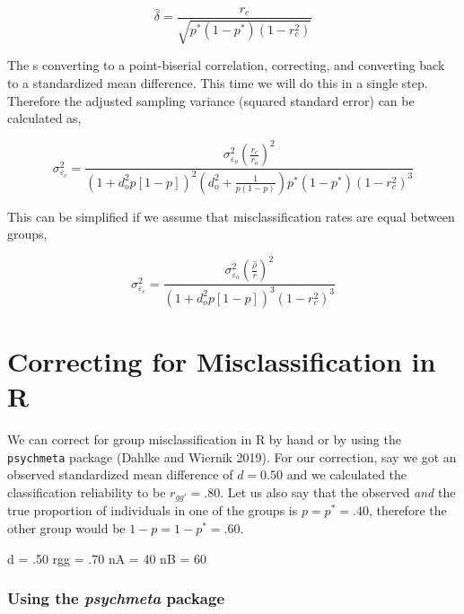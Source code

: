 \documentclass[
  letterpaper,
  DIV=11,
  numbers=noendperiod]{scrreprt}
\newenvironment{Shaded}{\begin{snugshade}}{\end{snugshade}}
\newcommand{\DecValTok}[1]{\textcolor[rgb]{0.68,0.00,0.00}{#1}}
\newcommand{\NormalTok}[1]{\textcolor[rgb]{0.00,0.23,0.31}{#1}}
\newcommand{\OtherTok}[1]{\textcolor[rgb]{0.00,0.23,0.31}{#1}}
\begin{document}
\[
\hat{\delta} = \frac{r_c}{\sqrt{p^*\left(1-p^*\right)\left(1-r_c^2\right)}}
\]

The s converting to a point-biserial correlation, correcting, and
converting back to a standardized mean difference. This time we will do
this in a single step. Therefore the adjusted sampling variance (squared
standard error) can be calculated as,

\[
\sigma^2_{\varepsilon_c} = \frac {\sigma^2_{\varepsilon_o}\left(\frac{r_c}{r_o}\right)^2} {\left(1+d_o^2p[1-p]\right)^2\left(d_o^2+\frac{1}{p(1-p)}\right)p^*(1-p^*)(1-r_c^2)^3}
\]

This can be simplified if we assume that misclassification rates are
equal between groups,

\[
\sigma^2_{\varepsilon_c} = \frac {\sigma^2_{\varepsilon_o}\left(\frac{\hat{\rho}}{r}\right)^2} {\left(1+d_o^2p[1-p]\right)^3(1-r_c^2)^3}
\]

\hypertarget{correcting-for-misclassification-in-r}{%
\section{Correcting for Misclassification in
R}\label{correcting-for-misclassification-in-r}}

We can correct for group misclassification in R by hand or by using the
\texttt{psychmeta} package (Dahlke and Wiernik 2019). For our
correction, say we got an observed standardized mean difference of
\(d = 0.50\) and we calculated the classification reliability to be
\(r_{gg'} = .80\). Let us also say that the observed \emph{and} the true
proportion of individuals in one of the groups is \(p=p^*=.40\),
therefore the other group would be \(1-p=1-p^*=.60\).

\begin{Shaded}
\begin{Highlighting}[]
\NormalTok{d }\OtherTok{=}\NormalTok{ .}\DecValTok{50}
\NormalTok{rgg }\OtherTok{=}\NormalTok{ .}\DecValTok{70}
\NormalTok{nA }\OtherTok{=} \DecValTok{40}
\NormalTok{nB }\OtherTok{=} \DecValTok{60}
\end{Highlighting}
\end{Shaded}

\hypertarget{using-the-psychmeta-package}{%
\subsubsection*{\texorpdfstring{Using the \emph{psychmeta}
package}{Using the psychmeta package}}\label{using-the-psychmeta-package}}
\end{document}
